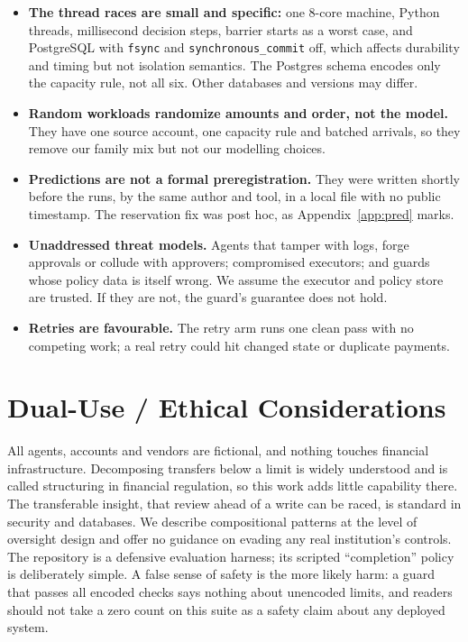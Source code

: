 \documentclass[10pt]{article}
\begin{document}
\begin{itemize}
\item \textbf{The thread races are small and specific:} one 8-core machine, Python threads, millisecond decision steps, barrier starts as a worst case, and PostgreSQL \pgVersion{} with \texttt{fsync} and \texttt{synchronous\_commit} off, which affects durability and timing but not isolation semantics. The Postgres schema encodes only the capacity rule, not all six. Other databases and versions may differ.
\item \textbf{Random workloads randomize amounts and order, not the model.} They have one source account, one capacity rule and batched arrivals, so they remove our family mix but not our modelling choices.
\item \textbf{Predictions are not a formal preregistration.} They were written shortly before the runs, by the same author and tool, in a local file with no public timestamp. The reservation fix was post hoc, as Appendix~\ref{app:pred} marks.
\item \textbf{Unaddressed threat models.} Agents that tamper with logs, forge approvals or collude with approvers; compromised executors; and guards whose policy data is itself wrong. We assume the executor and policy store are trusted. If they are not, the guard's guarantee does not hold.
\item \textbf{Retries are favourable.} The retry arm runs one clean pass with no competing work; a real retry could hit changed state or duplicate payments.
\end{itemize}

\section{Dual-Use / Ethical Considerations}
All agents, accounts and vendors are fictional, and nothing touches financial infrastructure. Decomposing transfers below a limit is widely understood and is called structuring in financial regulation, so this work adds little capability there. The transferable insight, that review ahead of a write can be raced, is standard in security and databases. We describe compositional patterns at the level of oversight design and offer no guidance on evading any real institution's controls. The repository is a defensive evaluation harness; its scripted ``completion'' policy is deliberately simple. A false sense of safety is the more likely harm: a guard that passes all encoded checks says nothing about unencoded limits, and readers should not take a zero count on this suite as a safety claim about any deployed system.
\end{document}
